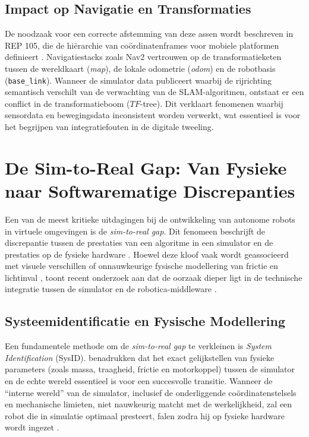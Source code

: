 \subsection{Impact op Navigatie en Transformaties}
De noodzaak voor een correcte afstemming van deze assen wordt beschreven in REP 105, die de hiërarchie van coördinatenframes voor mobiele platformen definieert \autocite{Meeussen2010}. Navigatiestacks zoals Nav2 vertrouwen op de transformatieketen tussen de wereldkaart (\textit{map}), de lokale odometrie (\textit{odom}) en de robotbasis (\texttt{base\_link}). Wanneer de simulator data publiceert waarbij de rijrichting semantisch verschilt van de verwachting van de SLAM-algoritmen, ontstaat er een conflict in de transformatieboom ($TF$-tree). Dit verklaart fenomenen waarbij sensordata en bewegingsdata inconsistent worden verwerkt, wat essentieel is voor het begrijpen van integratiefouten in de digitale tweeling.

\section{De Sim-to-Real Gap: Van Fysieke naar Softwarematige Discrepanties}
\label{sec:sim_to_real_gap}
Een van de meest kritieke uitdagingen bij de ontwikkeling van autonome robots in virtuele omgevingen is de \textit{sim-to-real gap}. Dit fenomeen beschrijft de discrepantie tussen de prestaties van een algoritme in een simulator en de prestaties op de fysieke hardware \autocite{Hoefer2021}. Hoewel deze kloof vaak wordt geassocieerd met visuele verschillen of onnauwkeurige fysische modellering van frictie en lichtinval \autocite{Tan2018, Hoefer2021}, toont recent onderzoek aan dat de oorzaak dieper ligt in de technische integratie tussen de simulator en de robotica-middleware \autocite{Hoefer2021, Peng2020}.

\subsection{Systeemidentificatie en Fysische Modellering}
Een fundamentele methode om de \textit{sim-to-real gap} te verkleinen is \textit{System Identification} (SysID). \textcite{Tan2018} benadrukken dat het exact gelijkstellen van fysieke parameters (zoals massa, traagheid, frictie en motorkoppel) tussen de simulator en de echte wereld essentieel is voor een succesvolle transitie. Wanneer de ``interne wereld'' van de simulator, inclusief de onderliggende coördinatenstelsels en mechanische limieten, niet nauwkeurig matcht met de werkelijkheid, zal een robot die in simulatie optimaal presteert, falen zodra hij op fysieke hardware wordt ingezet \autocite{Tan2018}.

